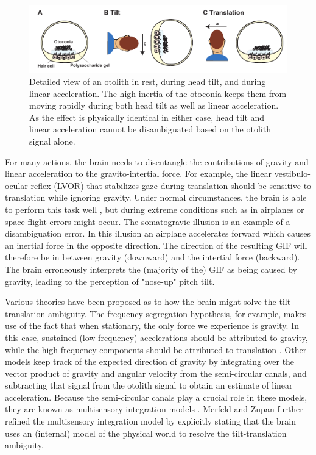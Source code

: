 \begin{figure}
    \includegraphics[width=1.0\textwidth]{src/intro/figures/otoliths.pdf}
    \caption{Detailed view of an otolith  in rest,  during head tilt, and  during linear acceleration. The high inertia of the otoconia keeps them from moving rapidly during both head tilt as well as linear acceleration. As the effect is physically identical in either case, head tilt and linear acceleration cannot be disambiguated based on the otolith signal alone.}
    \label{intro:fig:otoliths}
\end{figure}

For many actions, the brain needs to disentangle the contributions of gravity and linear acceleration to the gravito-intertial force. For example, the linear vestibulo-ocular reflex (LVOR) that stabilizes gaze during translation should be sensitive to translation while ignoring gravity. Under normal circumstances, the brain is able to perform this task well \cite{merfeld1995}, but during extreme conditions such as in airplanes or space flight errors might occur. The somatogravic illusion \cite{glasauer1995} is an example of a disambiguation error. In this illusion an airplane accelerates forward which causes an inertial force in the opposite direction. The direction of the resulting GIF will therefore be in between gravity (downward) and the intertial force (backward). The brain erroneously interprets the (majority of the) GIF as being caused by gravity, leading to the perception of "nose-up" pitch tilt.

Various theories have been proposed as to how the brain might solve the tilt-translation ambiguity. The frequency segregation hypothesis, for example, makes use of the fact that when stationary, the only force we experience is gravity. In this case, sustained (low frequency) accelerations should be  attributed to gravity, while the high frequency components should be attributed to translation \cite{paige1991, telford1997}. Other models keep track of the expected direction of gravity by integrating over the vector product of gravity and angular velocity from the semi-circular canals, and subtracting that signal from the otolith signal to obtain an estimate of linear acceleration. Because the semi-circular canals play a crucial role in these models, they are known as multisensory integration models \cite{mayne1974,ormsby1977}. Merfeld and Zupan \citeyear{merfeld1995,merfeld2002} further refined the multisensory integration model by explicitly stating that the brain uses an (internal) model of the physical world to resolve the tilt-translation ambiguity.

